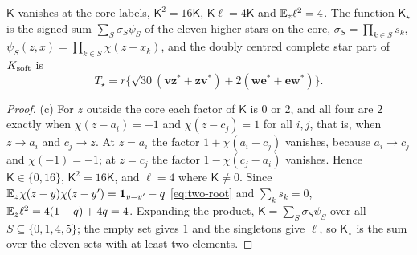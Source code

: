 \begin{lemma}
\begin{enumerate}[label=\textup{(\alph*)}]
 $\mathsf K$ vanishes at the core labels, $\mathsf K^2=16\mathsf K$,
 $\mathsf K\ell=4\mathsf K$ and $\mathbb E_z\ell^2=4$. The function $\mathsf K_\star$ is
 the signed sum $\sum_S\sigma_S\psi_S$ of the eleven higher stars on the core,
 $\sigma_S=\prod_{k\in S}s_k$, $\psi_S(z,x)=\prod_{k\in S}\chi(z-x_k)$, and the
 doubly centred complete star part of $K_{\rm soft}$ is
 \begin{equation}\label{eq:l20-rank4-operator}
  T_\star=r\bigl\{\sqrt{30}(\mathbf v\mathbf z^*+\mathbf z\mathbf v^*)
  +2(\mathbf w\mathbf e^*+\mathbf e\mathbf w^*)\bigr\}.
 \end{equation}
\end{enumerate}
\end{lemma}

\begin{proof}
(c) For $z$ outside the core each factor of $\mathsf K$ is $0$ or $2$, and all
four are $2$ exactly when $\chi(z-a_i)=-1$ and $\chi(z-c_j)=1$ for all $i,j$,
that is, when $z\to a_i$ and $c_j\to z$. At $z=a_i$ the factor
$1+\chi(a_i-c_j)$ vanishes, because $a_i\to c_j$ and $\chi(-1)=-1$; at $z=c_j$
the factor $1-\chi(c_j-a_i)$ vanishes. Hence $\mathsf K\in\{0,16\}$,
$\mathsf K^2=16\mathsf K$, and $\ell=4$ where $\mathsf K\ne0$. Since
$\mathbb E_z\chi(z-y)\chi(z-y')=\mathbf 1_{y=y'}-q$ \eqref{eq:two-root} and
$\sum_ks_k=0$, $\mathbb E_z\ell^2=4(1-q)+4q=4$. Expanding the product,
$\mathsf K=\sum_S\sigma_S\psi_S$ over all $S\subseteq\{0,1,4,5\}$; the empty set
gives $1$ and the singletons give $\ell$, so $\mathsf K_\star$ is the sum over
the eleven sets with at least two elements.


\end{proof}
